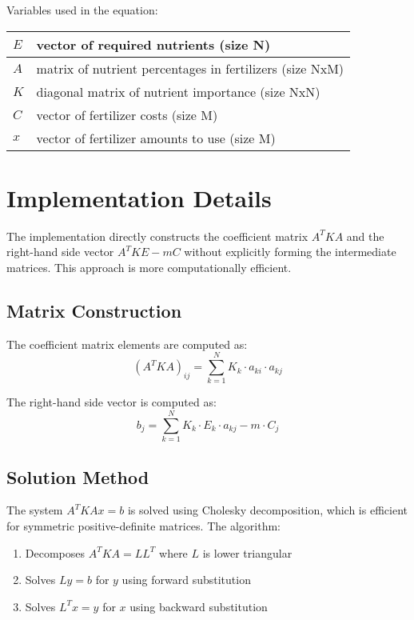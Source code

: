 \documentclass[12pt]{article}
\begin{document}
Variables used in the equation:
\begin{table}[ht!]
\def\arraystretch{1.5}
\centering
\begin{tabular}{|l|l|}
\hline
$E$ & vector of required nutrients (size N) \\ \hline
$A$ & matrix of nutrient percentages in fertilizers (size NxM) \\ \hline
$K$ & diagonal matrix of nutrient importance (size NxN) \\ \hline
$C$ & vector of fertilizer costs (size M) \\ \hline
$x$ & vector of fertilizer amounts to use (size M) \\ \hline
\end{tabular}
\end{table}

\section{Implementation Details}

The implementation directly constructs the coefficient matrix $A^T K A$ and the right-hand side vector $A^T K E - m C$ without explicitly forming the intermediate matrices. This approach is more computationally efficient.

\subsection{Matrix Construction}
The coefficient matrix elements are computed as:
\begin{equation}
(A^T K A)_{ij} = \sum_{k=1}^{N} K_k \cdot a_{ki} \cdot a_{kj}
\end{equation}

The right-hand side vector is computed as:
\begin{equation}
b_j = \sum_{k=1}^{N} K_k \cdot E_k \cdot a_{kj} - m \cdot C_j
\end{equation}

\subsection{Solution Method}
The system $A^T K A x = b$ is solved using Cholesky decomposition, which is efficient for symmetric positive-definite matrices. The algorithm:
\begin{enumerate}
\item Decomposes $A^T K A = L L^T$ where $L$ is lower triangular
\item Solves $L y = b$ for $y$ using forward substitution
\item Solves $L^T x = y$ for $x$ using backward substitution
\end{enumerate}
\end{document}
